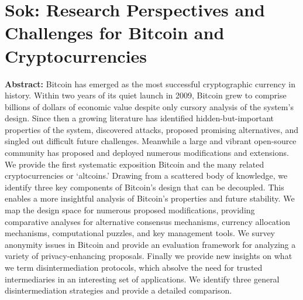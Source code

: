 \section{Sok: Research Perspectives and Challenges for Bitcoin and Cryptocurrencies}

\textbf{Abstract:} 
Bitcoin has emerged as the most successful cryptographic currency in history. Within two years of its quiet launch in 2009, Bitcoin grew to comprise billions of dollars of economic value despite only cursory analysis of the system’s design. Since then a growing literature has identified hidden-but-important properties of the system, discovered attacks, proposed promising alternatives, and singled out difficult future challenges. Meanwhile a large and vibrant open-source community has proposed and deployed numerous modifications and extensions. We provide the first systematic exposition Bitcoin and the many related cryptocurrencies or ‘altcoins.’ Drawing from a scattered body of knowledge, we identify three key components of Bitcoin’s design that can be decoupled. This enables a more insightful analysis of Bitcoin’s properties and future stability. We map the design space for numerous proposed modifications, providing comparative analyses for alternative consensus mechanisms, currency allocation mechanisms, computational puzzles, and key management tools. We survey anonymity issues in Bitcoin and provide an evaluation framework for analyzing a variety of privacy-enhancing proposals. Finally we provide new insights on what we term disintermediation protocols, which absolve the need for trusted intermediaries in an interesting set of applications. We identify three general disintermediation strategies and provide a detailed comparison.
